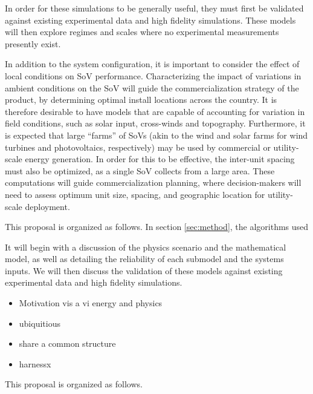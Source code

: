 In order for these simulations to be generally useful, they must first
be validated against existing experimental data and high fidelity
simulations. These models will then explore regimes and scales where no
experimental measurements presently exist. 


In addition to the system configuration, it is important to consider the
effect of local conditions on SoV performance. Characterizing the impact
of variations in ambient conditions on the SoV will guide the
commercialization strategy of the product, by determining optimal
install locations across the country. It is therefore desirable to have models
that are capable of accounting for variation in field conditions, such as solar
input, cross-winds and topography. Furthermore, it is expected that 
large ``farms'' of SoVs (akin to the wind and solar farms for wind
turbines and photovoltaics, respectively) may be used by commercial or
utility-scale energy generation. In order for this to be effective, 
the inter-unit spacing must also be optimized, as a single SoV collects
from a large area. These computations will guide commercialization
planning, where decision-makers will need to assess optimum unit size,
spacing, and geographic location for utility-scale deployment.  

This proposal is organized as follows. 
In section \ref{sec:method},
the algorithms used 


It will begin with a discussion of the
physics scenario and the mathematical model, as well as detailing the
reliability of each submodel and the systems inputs. We will then
discuss the validation of these models against existing experimental
data and high fidelity simulations. 

\begin{itemize}
\item Motivation vis a vi energy and physics
\item ubiquitious
\item share a common structure
\item harnessx
\end{itemize}



This proposal is organized as follows. 
